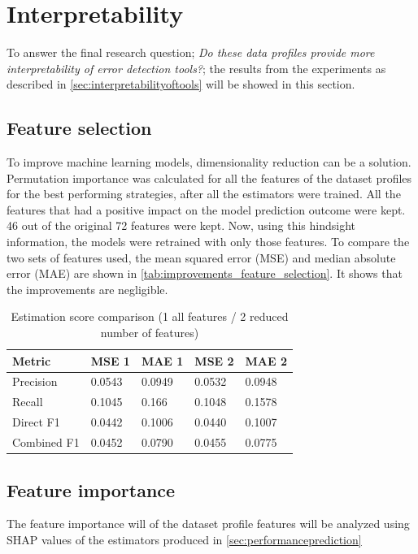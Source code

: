 \newpage
\section{Interpretability}
To answer the final research question; \textit{Do these data profiles provide more interpretability of error detection tools?}; the results from the experiments as described in \autoref{sec:interpretabilityoftools} will be showed in this section.

\subsection{Feature selection}
To improve machine learning models, dimensionality reduction can be a solution. Permutation importance was calculated for all the features of the dataset profiles for the best performing strategies, after all the estimators were trained. All the features that had a positive impact on the model prediction outcome were kept. 46 out of the original 72 features were kept. Now, using this hindsight information, the models were retrained with only those features. To compare the two sets of features used, the mean squared error (MSE) and median absolute error (MAE) are shown in \autoref{tab:improvements_feature_selection}. It shows that the improvements are negligible.

\begin{table}[h]
\centering
\begin{tabular}{l|ll|ll}
\textbf{Metric} & \textbf{MSE 1} & \textbf{MAE 1} & \textbf{MSE 2} & \textbf{MAE 2} \\ \hline
Precision       & 0.0543         & 0.0949         & 0.0532         & 0.0948         \\
Recall          & 0.1045         & 0.166          & 0.1048         & 0.1578         \\
Direct F1       & 0.0442         & 0.1006         & 0.0440         & 0.1007         \\
Combined F1     & 0.0452         & 0.0790         & 0.0455         & 0.0775        
\end{tabular}
\caption{Estimation score comparison (1 all features / 2 reduced number of features)}
\label{tab:improvements_feature_selection}
\end{table}


\subsection{Feature importance}
The feature importance will of the dataset profile features will be analyzed using SHAP values of the estimators produced in \autoref{sec:performanceprediction}

